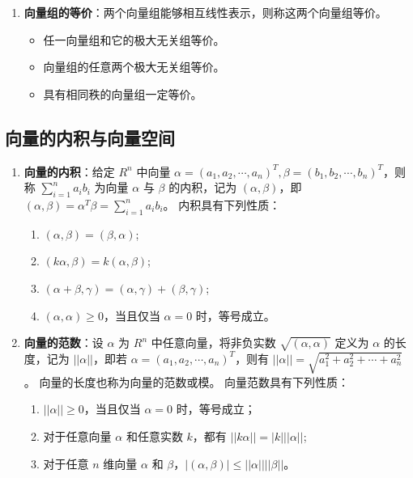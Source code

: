 \documentclass[UTF8]{ctexart}
\theoremstyle{mydef}
\begin{document}
\begin{enumerate}
    \item \textbf{向量组的等价}：两个向量组能够相互线性表示，则称这两个向量组等价。
    \begin{itemize}
        \item 任一向量组和它的极大无关组等价。
        \item 向量组的任意两个极大无关组等价。
        \item 具有相同秩的向量组一定等价。
    \end{itemize}
\end{enumerate}

\subsection{向量的内积与向量空间}

\begin{enumerate}
    \item \textbf{向量的内积}：给定 $R^n$ 中向量 $\alpha=(a_1, a_2, \cdots, a_n)^T, \beta=(b_1, b_2, \cdots, b_n)^T$，则称 $\sum_{i=1}^n a_i b_i$ 为向量 $\alpha$ 与 $\beta$ 的内积，记为 $(\alpha, \beta)$，即 $(\alpha, \beta) = \alpha^T \beta = \sum_{i=1}^n a_i b_i$。
    内积具有下列性质：
    \begin{enumerate}
        \item $(\alpha, \beta) = (\beta, \alpha)$;
        \item $(k\alpha, \beta) = k(\alpha, \beta)$;
        \item $(\alpha + \beta, \gamma) = (\alpha, \gamma) + (\beta, \gamma)$;
        \item $(\alpha, \alpha) \ge 0$，当且仅当 $\alpha=0$ 时，等号成立。
    \end{enumerate}

    \item \textbf{向量的范数}：设 $\alpha$ 为 $R^n$ 中任意向量，将非负实数 $\sqrt{(\alpha, \alpha)}$ 定义为 $\alpha$ 的长度，记为 $||\alpha||$，即若 $\alpha=(a_1, a_2, \cdots, a_n)^T$，则有 $||\alpha|| = \sqrt{a_1^2 + a_2^2 + \cdots + a_n^2}$。
    向量的长度也称为向量的范数或模。
    向量范数具有下列性质：
    \begin{enumerate}
        \item $||\alpha|| \ge 0$，当且仅当 $\alpha=0$ 时，等号成立；
        \item 对于任意向量 $\alpha$ 和任意实数 $k$，都有 $||k\alpha|| = |k| ||\alpha||$;
        \item 对于任意 $n$ 维向量 $\alpha$ 和 $\beta$，$|(\alpha, \beta)| \le ||\alpha|| ||\beta||$。
    \end{enumerate}


\end{enumerate}
\end{document}
